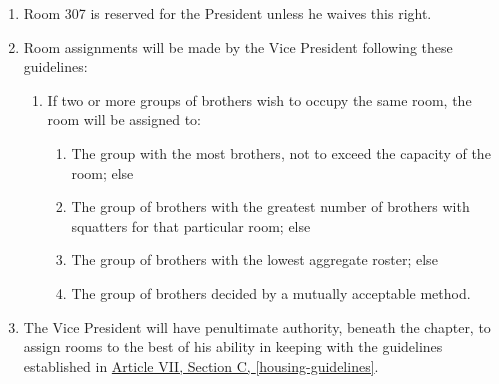 \begin{enumerate}
		\item Room 307 is reserved for the President unless he waives this right.

		\item Room assignments will be made by the Vice President following these guidelines: \label{housing-guidelines}
			\begin{enumerate}
				\item If two or more groups of brothers wish to occupy the same room, the room will be assigned to:

					\begin{enumerate}
						\item The group with the most brothers, not to exceed the capacity of the room; else
						\item The group of brothers with the greatest number of brothers with \gls{squatters} for that particular room; else
						\item The group of brothers with the lowest aggregate \gls{roster}; else
						\item The group of brothers decided by a mutually acceptable method.
					\end{enumerate}
			\end{enumerate}

		\item The Vice President will have penultimate authority, beneath the chapter, to assign rooms to the best of his ability in keeping with the guidelines established in \hyperref[housing-guidelines]{Article VII, Section C, \autoref*{housing-guidelines}}.

	\end{enumerate}
